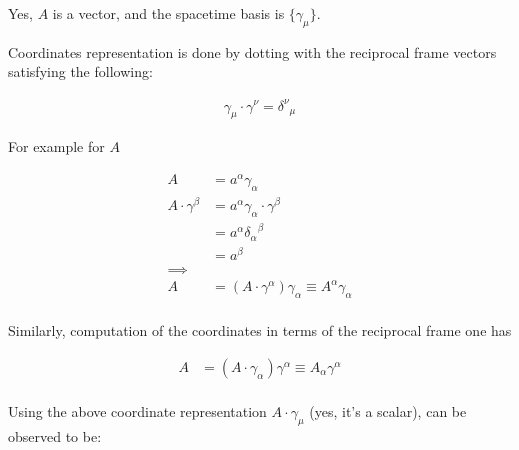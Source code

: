 \documentclass{article}      %
\begin{document}




Yes, $A$ is a vector, and the spacetime basis is $\{\gamma_\mu\}$.

Coordinates representation is done by dotting with the reciprocal frame
vectors satisfying the following:

\begin{align*}
\gamma_\mu \cdot \gamma^\nu = {\delta^\nu}_\mu
\end{align*}

For example for $A$

\begin{align*}
A &= a^\alpha \gamma_\alpha \\
A \cdot \gamma^\beta
&= a^\alpha \gamma_\alpha \cdot \gamma^\beta \\
&= a^\alpha {\delta_\alpha}^\beta \\
&= a^\beta \\
\implies \\
A &= \left(A \cdot \gamma^\alpha\right) \gamma_\alpha \equiv A^\alpha \gamma_\alpha \\
\end{align*}

Similarly, computation of the coordinates in terms of the reciprocal frame
one has

\begin{align*}
A &= \left(A \cdot \gamma_\alpha\right) \gamma^\alpha \equiv A_\alpha \gamma^\alpha \\
\end{align*}

Using the above coordinate representation $A \cdot \gamma_\mu$ (yes, it's a scalar), can be observed to be:
\end{document}
